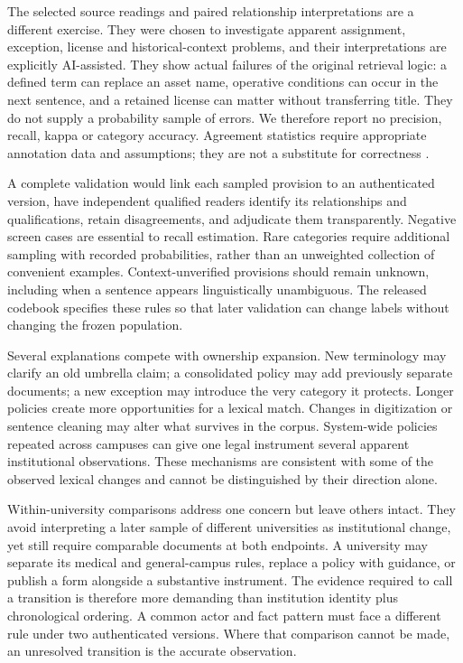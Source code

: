 \documentclass[12pt]{article}
\begin{document}
The selected source readings and paired relationship interpretations are a different exercise. They were chosen to investigate apparent assignment, exception, license and historical-context problems, and their interpretations are explicitly AI-assisted. They show actual failures of the original retrieval logic: a defined term can replace an asset name, operative conditions can occur in the next sentence, and a retained license can matter without transferring title. They do not supply a probability sample of errors. We therefore report no precision, recall, kappa or category accuracy. Agreement statistics require appropriate annotation data and assumptions; they are not a substitute for correctness \citep{artstein2008}.

A complete validation would link each sampled provision to an authenticated version, have independent qualified readers identify its relationships and qualifications, retain disagreements, and adjudicate them transparently. Negative screen cases are essential to recall estimation. Rare categories require additional sampling with recorded probabilities, rather than an unweighted collection of convenient examples. Context-unverified provisions should remain unknown, including when a sentence appears linguistically unambiguous. The released codebook specifies these rules so that later validation can change labels without changing the frozen population.

Several explanations compete with ownership expansion. New terminology may clarify an old umbrella claim; a consolidated policy may add previously separate documents; a new exception may introduce the very category it protects. Longer policies create more opportunities for a lexical match. Changes in digitization or sentence cleaning may alter what survives in the corpus. System-wide policies repeated across campuses can give one legal instrument several apparent institutional observations. These mechanisms are consistent with some of the observed lexical changes and cannot be distinguished by their direction alone.

Within-university comparisons address one concern but leave others intact. They avoid interpreting a later sample of different universities as institutional change, yet still require comparable documents at both endpoints. A university may separate its medical and general-campus rules, replace a policy with guidance, or publish a form alongside a substantive instrument. The evidence required to call a transition is therefore more demanding than institution identity plus chronological ordering. A common actor and fact pattern must face a different rule under two authenticated versions. Where that comparison cannot be made, an unresolved transition is the accurate observation.
\end{document}
